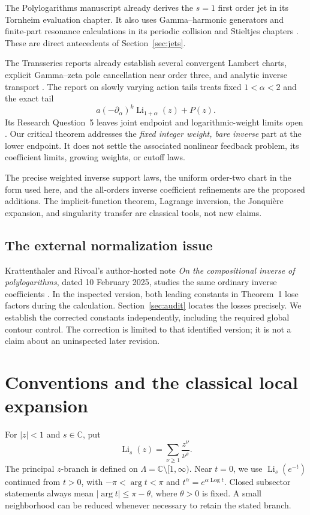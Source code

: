 \documentclass[11pt,a4paper]{article}
\numberwithin{equation}{section}
\theoremstyle{definition}
\theoremstyle{remark}
\DeclareMathOperator{\Li}{Li}
\DeclareMathOperator{\Log}{Log}
\newcommand{\C}{\mathbb C}
\begin{document}
The Polylogarithms manuscript already derives the \(s=1\) first order
jet in its Tornheim evaluation chapter.  It also uses Gamma--harmonic
generators and finite-part resonance calculations in its periodic
collision and Stieltjes chapters \cite{repo-poly}.
These are direct antecedents of Section~\ref{sec:jets}.

The Transseries reports already establish several convergent
Lambert charts, explicit Gamma--zeta pole cancellation near order three,
and analytic inverse transport \cite{repo-lambert,repo-confluent,repo-transport}.
The report on slowly varying action tails treats fixed
\(1<\alpha<2\) and the exact tail
\[
 a(-\partial_\alpha)^k\Li_{1+\alpha}(z)+P(z).
\]
Its Research Question~5 leaves joint endpoint and logarithmic-weight
limits open \cite{repo-slow}.  Our critical theorem addresses the
\emph{fixed integer weight, bare inverse} part at the lower endpoint.
It does not settle the associated nonlinear feedback problem, its
coefficient limits, growing weights, or cutoff laws.

The precise weighted inverse support laws, the uniform order-two chart
in the form used here, and the all-orders inverse coefficient refinements
are the proposed additions.  The implicit-function theorem, Lagrange
inversion, the Jonqui\`ere expansion, and singularity transfer are
classical tools, not new claims.

\subsection{The external normalization issue}

Krattenthaler and Rivoal's author-hosted note
\emph{On the compositional inverse of polylogarithms}, dated
10 February 2025, studies the same ordinary inverse coefficients
\cite{kr}.  In the inspected version, both leading constants in
Theorem~1 lose factors during the calculation.  Section~\ref{sec:audit}
locates the losses precisely.  We establish the corrected constants
independently, including the required global contour control.
The correction is limited to that identified version; it is not a claim
about an uninspected later revision.

\section{Conventions and the classical local expansion}
\label{sec:setup}

For \(|z|<1\) and \(s\in\C\), put
\[
 \Li_s(z)=\sum_{\nu\ge1}\frac{z^\nu}{\nu^s}.
\]
The principal \(z\)-branch is defined on
\(\Lambda=\C\setminus[1,\infty)\).  Near \(t=0\), we use
\(\Li_s(e^{-t})\) continued from \(t>0\), with
\(-\pi<\arg t<\pi\) and \(t^\alpha=e^{\alpha\Log t}\).
Closed subsector statements always mean
\(|\arg t|\le\pi-\theta\), where \(\theta>0\) is fixed.
A small neighborhood can be reduced whenever necessary to retain the
stated branch.
\end{document}
